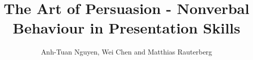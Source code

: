 \documentclass[review]{elsarticle}
\begin{document}
\begin{frontmatter}
\title{The Art of Persuasion - Nonverbal Behaviour in Presentation Skills}
\author{Anh-Tuan Nguyen, Wei Chen and Matthias Rauterberg}
\address{Designed Intelligence Group, Department of Industrial Design \\
Eindhoven University of Technology, 5600 MB, Eindhoven, The Netherlands
}

\begin{abstract}

\end{abstract}


\end{frontmatter}
\end{document}
